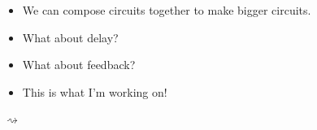 \documentclass{beamer}
\begin{document}
    \begin{frame}
        \begin{center}
        \end{center}
    \end{frame}
    \begin{frame}
        \begin{center}
        \end{center}
    \end{frame}
    \begin{frame}
        \begin{center}
        \end{center}
    \end{frame}
    \begin{frame}
        \begin{center}
        \end{center}
    \end{frame}
    \begin{frame}
        \begin{center}
        \end{center}
    \end{frame}
    \begin{frame}
        \begin{center}
        \end{center}
    \end{frame}
    \begin{frame}
        \begin{itemize}
            \item We can \alert{compose} circuits together to make \alert{bigger} circuits. \pause
            \item What about \alert{delay?} \pause
            \item What about \alert{feedback?} \pause
            \item This is what I'm working on! \pause
        \end{itemize}

        \begin{center}

            \vspace{1em}

            \pause
            \(\rightsquigarrow\)
        \end{center}
    \end{frame}
\end{document}
